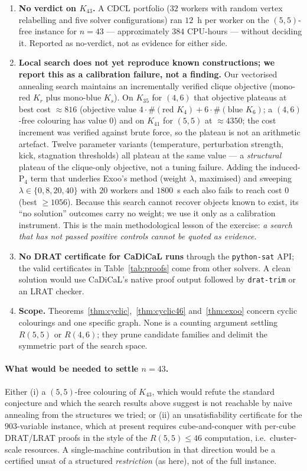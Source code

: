 \documentclass[11pt]{article}
\theoremstyle{definition}
\theoremstyle{plain}
\newcommand{\K}{\ensuremath{K}}
\newcommand{\R}[2]{\ensuremath{R(#1,#2)}}
\begin{document}
\begin{enumerate}
\item \textbf{No verdict on $\K_{43}$.} A CDCL portfolio ($32$ workers with
random vertex relabelling and five solver configurations) ran $12$~h per worker
on the $(5,5)$-free instance for $n = 43$ --- approximately $384$ CPU-hours ---
without deciding it. Reported as no-verdict, not as evidence for either side.
\item \textbf{Local search does not yet reproduce known constructions; we report
this as a calibration failure, not a finding.} Our vectorised annealing search
maintains an incrementally verified clique objective (mono-red $\K_r$ plus
mono-blue $\K_s$). On $K_{35}$ for $(4,6)$ that objective plateaus at
best cost $\approx 816$ (objective value $4\cdot\#(\text{red }K_4) +
6\cdot\#(\text{blue }K_6)$; a $(4,6)$-free colouring has value $0$) and on
$K_{41}$ for $(5,5)$ at $\approx 4350$; the cost increment was verified against
brute force, so the plateau is not an arithmetic artefact. Twelve parameter
variants (temperature, perturbation strength, kick, stagnation thresholds)
all plateau at the same value --- a \emph{structural} plateau of the
clique-only objective, not a tuning failure. Adding the induced-$\mathrm{P}_4$
term that underlies Exoo's method (weight $\lambda$, maximised) and sweeping
$\lambda \in \{0,8,20,40\}$ with $20$ workers and $1800$~s each also fails to
reach cost $0$ (best $\ge 1056$). Because this search cannot recover objects
known to exist, its ``no solution'' outcomes carry no weight; we use it only
as a calibration instrument. This is the main methodological lesson of the
exercise: \emph{a search that has not passed positive controls cannot be
quoted as evidence}.
\item \textbf{No DRAT certificate for CaDiCaL runs} through the
\texttt{python-sat} API; the valid certificates in Table~\ref{tab:proofs} come
from other solvers. A clean solution would use CaDiCaL's native proof output
followed by \texttt{drat-trim} or an LRAT checker.
\item \textbf{Scope.} Theorems~\ref{thm:cyclic},~\ref{thm:cyclic46}
and~\ref{thm:exoo} concern cyclic colourings and one specific graph. None is a
counting argument settling $\R{5}{5}$ or $\R{4}{6}$; they prune candidate
families and delimit the symmetric part of the search space.
\end{enumerate}

\paragraph{What would be needed to settle $n = 43$.}
Either (i) a $(5,5)$-free colouring of $\K_{43}$, which would refute the
standard conjecture and which the search results above suggest is not reachable
by naive annealing from the structures we tried; or (ii) an unsatisfiability
certificate for the $903$-variable instance, which at present requires
cube-and-conquer with per-cube DRAT/LRAT proofs in the style of the
$\R{5}{5} \le 46$ computation, i.e.\ cluster-scale resources. A single-machine
contribution in that direction would be a certified unsat of a structured
\emph{restriction} (as here), not of the full instance.
\end{document}
